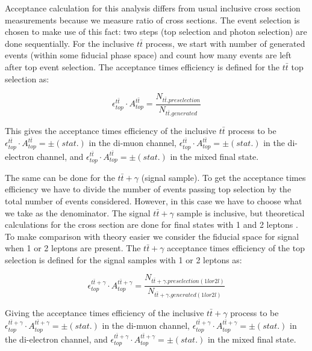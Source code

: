Acceptance calculation for this analysis differs from usual inclusive cross section measurements because we measure ratio of cross sections. The event selection is chosen to make use of this fact: two steps (top selection and photon selection) are done sequentially. For the inclusive $t\bar{t}$ process, we start with number of generated events (within some fiducial phase space) and count how many events are left after top event selection. The acceptance times efficiency is defined for the $t\bar{t}$ top selection as:

\begin{equation}
	\epsilon^{t\bar{t}}_{top} \cdot A^{t\bar{t}}_{top} = \frac{N_{t\bar{t}.preselection}}{N_{t\bar{t}.generated}} 
\end{equation}

This gives the acceptance times efficiency of the inclusive $t\bar{t}$ process to be $\epsilon^{t\bar{t}}_{top} \cdot A^{t\bar{t}}_{top} =   \pm  (stat.)$ in the di-muon channel, $\epsilon^{t\bar{t}}_{top} \cdot A^{t\bar{t}}_{top} =  \pm  (stat.)$ in the di-electron channel, and $\epsilon^{t\bar{t}}_{top} \cdot A^{t\bar{t}}_{top} =  \pm  (stat.)$ in the mixed final state.

The same can be done for the $t\bar{t}+\gamma$ (signal sample). To get the acceptance times efficiency we have to divide the number of events passing top selection by the total number of events considered. However, in this case we have to choose what we take as the denominator. The signal $t\bar{t}+\gamma$ sample is inclusive, but theoretical calculations for the cross section are done for final states with 1 and 2 leptons \cite{QCDCorrectionsttgamma2011}. To make comparison with theory easier we consider the fiducial space for signal when 1 or 2 leptons are present. The $t\bar{t}+\gamma$ acceptance times efficiency of the top selection is defined for the signal samples with 1 or 2 leptons as:

\begin{equation}
	\epsilon^{t\bar{t}+\gamma}_{top} \cdot A^{t\bar{t}+\gamma}_{top} = \frac{N_{t\bar{t}+\gamma.preselection(1lor2l)}}{N_{t\bar{t}+\gamma.generated(1lor2l)}} 
\end{equation}

Giving the acceptance times efficiency of the inclusive $t\bar{t}+\gamma$ process to be $\epsilon^{t\bar{t}+\gamma}_{top} \cdot A^{t\bar{t}+\gamma}_{top} =   \pm  (stat.)$ in the di-muon channel, $\epsilon^{t\bar{t}+\gamma}_{top} \cdot A^{t\bar{t}+\gamma}_{top} =  \pm  (stat.)$ in the di-electron channel, and $\epsilon^{t\bar{t}+\gamma}_{top} \cdot A^{t\bar{t}+\gamma}_{top} =  \pm  (stat.)$ in the mixed final state.

